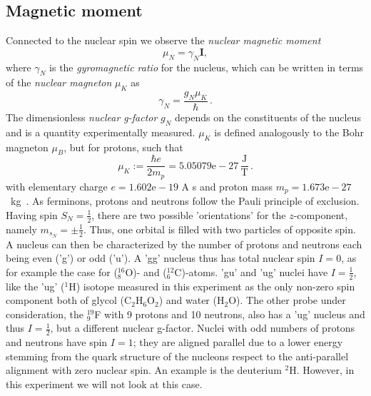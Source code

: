 \subsection{Magnetic moment}
Connected to the nuclear spin we observe the \emph{nuclear magnetic moment}
\begin{equation}
    \mu_N = \gamma_N \mathbf{I},
\end{equation}
where $\gamma_N$ is the \emph{gyromagnetic ratio} for the nucleus, which 
can be written in terms of the \emph{nuclear magneton} $\mu_K$
as
\begin{equation}
    \gamma_N = \frac{g_N \mu_K}{\hbar} \, .
    \label{eq:gamma}
\end{equation}
The dimensionless \emph{nuclear g-factor} $g_N$ depends on the constituents of the 
nucleus and is a quantity experimentally measured. $\mu_K$ is defined 
analogously to the Bohr magneton $\mu_B$, but for protons, such that 
\begin{equation}
    \mu_K := \frac{\hbar e}{2 m_p} = 5.05079\mathrm{e}-27 \, \mathrm{\frac{J}{T}}\, .
\end{equation}
with elementary charge $e = 1.602\mathrm{e}-19$ A s 
and proton mass $m_p = 1.673\mathrm{e}-27$~kg~\cite{Demtroeder1}.
As ferminons, protons and neutrons follow the Pauli principle of exclusion. 
Having spin $S_N = \frac{1}{2}$, there are two possible 'orientations' for 
the $z$-component, namely $m_{s_N} = \pm \frac{1}{2}$. Thus, one orbital 
is filled with two particles of opposite spin. A nucleus can then be 
characterized by the number of protons and neutrons each being 
even ('g') or odd ('u'). A 'gg' nucleus thus has total nuclear spin $I = 0$, 
as for example the case for ($_8^{16}$O)- and ($_6^{12}$C)-atoms. 
'gu' and 'ug' nuclei have $I = \frac{1}{2}$, like the 'ug' ($^1$H) isotope 
measured in this experiment as the only non-zero spin component both of 
glycol (C$_2$H$_6$O$_2$) and water (H$_2$O). The other probe under consideration, 
the $_9^{19}$F with 9 protons and 10 neutrons, 
also has a 'ug' nucleus and thus $I = \frac{1}{2}$, but a different nuclear g-factor. 
Nuclei with odd numbers of 
protons and neutrons have spin $I = 1$; they are aligned parallel due to a lower 
energy stemming from the quark structure of the nucleons respect to the anti-parallel 
alignment with zero nuclear spin. An example is the deuterium $^2$H. However, in this 
experiment we will not look at this case. 

